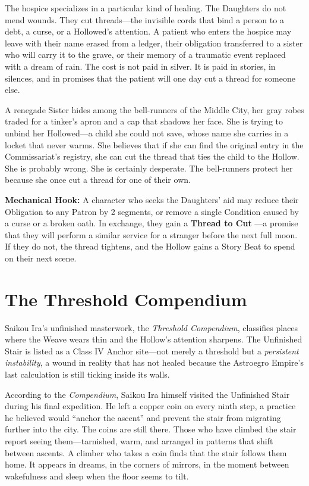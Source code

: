\documentclass[10pt,twocolumn]{book}
\begin{document}
The hospice specializes in a particular kind of healing. The Daughters do not mend wounds. They cut threads---the invisible cords that bind a person to a debt, a curse, or a Hollowed's attention. A patient who enters the hospice may leave with their name erased from a ledger, their obligation transferred to a sister who will carry it to the grave, or their memory of a traumatic event replaced with a dream of rain. The cost is not paid in silver. It is paid in stories, in silences, and in promises that the patient will one day cut a thread for someone else.

A renegade Sister hides among the bell-runners of the Middle City, her gray robes traded for a tinker's apron and a cap that shadows her face. She is trying to unbind her Hollowed---a child she could not save, whose name she carries in a locket that never warms. She believes that if she can find the original entry in the Commissariat's registry, she can cut the thread that ties the child to the Hollow. She is probably wrong. She is certainly desperate. The bell-runners protect her because she once cut a thread for one of their own.

\textbf{Mechanical Hook:} A character who seeks the Daughters' aid may reduce their Obligation to any Patron by 2 segments, or remove a single Condition caused by a curse or a broken oath. In exchange, they gain a \textbf{Thread to Cut} ---a promise that they will perform a similar service for a stranger before the next full moon. If they do not, the thread tightens, and the Hollow gains a Story Beat to spend on their next scene.

\section{The Threshold Compendium}

Saikou Ira's unfinished masterwork, the \textit{Threshold Compendium}, classifies places where the Weave wears thin and the Hollow's attention sharpens. The Unfinished Stair is listed as a Class IV Anchor site---not merely a threshold but a \textit{persistent instability}, a wound in reality that has not healed because the Astroegro Empire's last calculation is still ticking inside its walls.

According to the \textit{Compendium}, Saikou Ira himself visited the Unfinished Stair during his final expedition. He left a copper coin on every ninth step, a practice he believed would ``anchor the ascent'' and prevent the stair from migrating further into the city. The coins are still there. Those who have climbed the stair report seeing them---tarnished, warm, and arranged in patterns that shift between ascents. A climber who takes a coin finds that the stair follows them home. It appears in dreams, in the corners of mirrors, in the moment between wakefulness and sleep when the floor seems to tilt.
\end{document}
